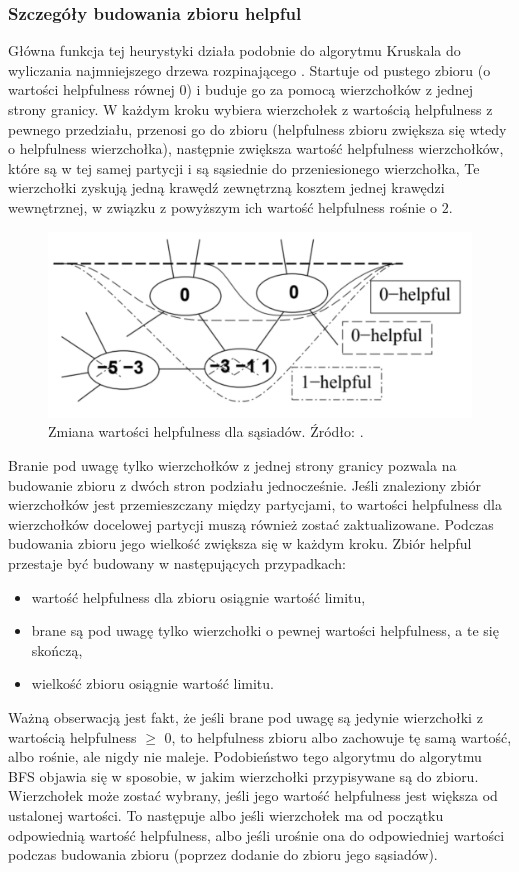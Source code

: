 \subsubsection{Szczegóły budowania zbioru helpful}
Główna funkcja tej heurystyki działa podobnie do algorytmu Kruskala do wyliczania
najmniejszego drzewa rozpinającego \cite{algorithms222}.
Startuje od pustego zbioru (o wartości helpfulness równej $0$) i buduje go za pomocą wierzchołków z jednej strony granicy.
W każdym kroku wybiera wierzchołek z wartością helpfulness z pewnego przedziału, przenosi go do zbioru
(helpfulness zbioru zwiększa się wtedy o helpfulness wierzchołka), następnie zwiększa wartość helpfulness wierzchołków,
które są w tej samej partycji i są sąsiednie do przeniesionego wierzchołka,
Te wierzchołki zyskują jedną krawędź zewnętrzną
kosztem jednej krawędzi wewnętrznej, w związku z powyższym ich wartość helpfulness rośnie o $2$.
\begin{figure}[h]
    \centering
    \includegraphics[width=0.6\linewidth]{images/changing_helpful_values}
    \caption{Zmiana wartości helpfulness dla sąsiadów.
    Źródło: \cite{article}.}
    \label{im:helpfulness_neighbours}
\end{figure}

Branie pod uwagę tylko wierzchołków z jednej strony granicy pozwala na budowanie zbioru z dwóch stron podziału jednocześnie.
Jeśli znaleziony zbiór wierzchołków jest przemieszczany między partycjami, to wartości helpfulness dla wierzchołków
docelowej partycji muszą również zostać zaktualizowane.
Podczas budowania zbioru jego wielkość zwiększa się w każdym kroku.
Zbiór helpful przestaje być budowany w następujących przypadkach:
\begin{itemize}
    \item wartość helpfulness dla zbioru osiągnie wartość limitu,
    \item {brane są pod uwagę tylko wierzchołki o pewnej wartości helpfulness, a te się skończą,}
    \item wielkość zbioru osiągnie wartość limitu.
\end{itemize}
Ważną obserwacją jest fakt, że jeśli brane pod uwagę są jedynie wierzchołki z wartością helpfulness $\geq$ $0$,
to helpfulness zbioru albo zachowuje tę samą wartość, albo rośnie, ale nigdy nie maleje.
Podobieństwo tego algorytmu do algorytmu BFS objawia się w sposobie, w jakim wierzchołki przypisywane są do zbioru.
Wierzchołek może zostać wybrany, jeśli jego wartość helpfulness jest większa od ustalonej wartości.
To następuje albo jeśli wierzchołek ma od początku odpowiednią wartość helpfulness, albo jeśli urośnie ona do odpowiedniej
wartości podczas budowania zbioru (poprzez dodanie do zbioru jego sąsiadów).

